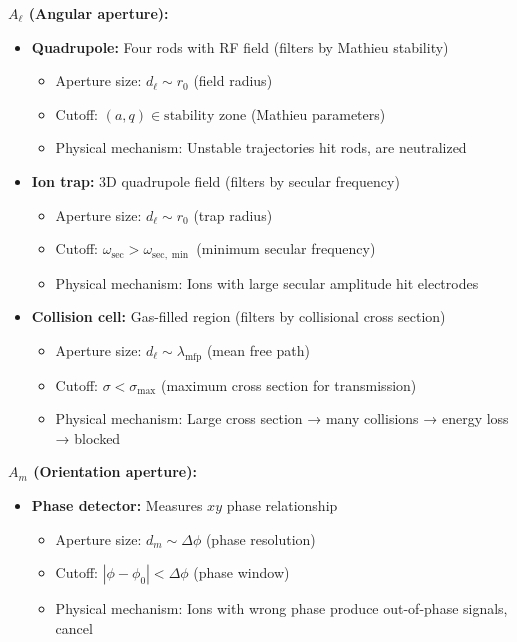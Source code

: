 \begin{proposition}
\textbf{$A_\ell$ (Angular aperture):}
\begin{itemize}
    \item \textbf{Quadrupole:} Four rods with RF field (filters by Mathieu stability)
        \begin{itemize}
        \item Aperture size: $d_\ell \sim r_0$ (field radius)
        \item Cutoff: $(a, q) \in \text{stability zone}$ (Mathieu parameters)
        \item Physical mechanism: Unstable trajectories hit rods, are neutralized
        \end{itemize}
    
    \item \textbf{Ion trap:} 3D quadrupole field (filters by secular frequency)
        \begin{itemize}
        \item Aperture size: $d_\ell \sim r_0$ (trap radius)
        \item Cutoff: $\omega_{\text{sec}} > \omega_{\text{sec},\min}$ (minimum secular frequency)
        \item Physical mechanism: Ions with large secular amplitude hit electrodes
        \end{itemize}
    
    \item \textbf{Collision cell:} Gas-filled region (filters by collisional cross section)
        \begin{itemize}
        \item Aperture size: $d_\ell \sim \lambda_{\text{mfp}}$ (mean free path)
        \item Cutoff: $\sigma < \sigma_{\max}$ (maximum cross section for transmission)
        \item Physical mechanism: Large cross section → many collisions → energy loss → blocked
        \end{itemize}
\end{itemize}

\textbf{$A_m$ (Orientation aperture):}
\begin{itemize}
    \item \textbf{Phase detector:} Measures $xy$ phase relationship
        \begin{itemize}
        \item Aperture size: $d_m \sim \Delta\phi$ (phase resolution)
        \item Cutoff: $|\phi - \phi_0| < \Delta\phi$ (phase window)
        \item Physical mechanism: Ions with wrong phase produce out-of-phase signals, cancel
        \end{itemize}
    

\end{itemize}
\end{proposition}
